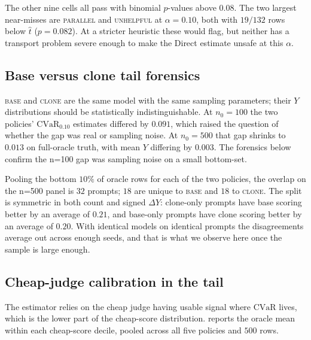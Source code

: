 \documentclass[11pt]{article}
\newcommand{\that}{\widehat{t}}
\newcommand{\CVaR}{\mathrm{CVaR}}
\begin{document}
The other nine cells all pass with binomial $p$-values above $0.08$.
The two largest near-misses are \textsc{parallel} and \textsc{unhelpful}
at $\alpha = 0.10$, both with $19/132$ rows below $\that$ ($p = 0.082$).
At a stricter heuristic these would flag, but neither has a transport
problem severe enough to make the Direct estimate unsafe at this
$\alpha$.

\subsection{Base versus clone tail forensics}
\label{app:bcforensics}

\textsc{base} and \textsc{clone} are the same model with the same
sampling parameters; their $Y$ distributions should be statistically
indistinguishable. At $n_0 = 100$ the two policies' $\CVaR_{0.10}$
estimates differed by $0.091$, which raised the question of whether
the gap was real or sampling noise. At $n_0 = 500$ that gap shrinks
to $0.013$ on full-oracle truth, with mean $Y$ differing by $0.003$.
The forensics below confirm the n=100 gap was sampling noise on a
small bottom-set.

Pooling the bottom $10\%$ of oracle rows for each of the two policies,
the overlap on the n=500 panel is $32$ prompts; $18$ are unique to
\textsc{base} and $18$ to \textsc{clone}. The split is symmetric in
both count and signed $\Delta Y$: clone-only prompts have base scoring
better by an average of $0.21$, and base-only prompts have clone
scoring better by an average of $0.20$. With identical models on
identical prompts the disagreements average out across enough seeds,
and that is what we observe here once the sample is large enough.

\subsection{Cheap-judge calibration in the tail}
\label{app:reliability}

The estimator relies on the cheap judge having usable signal where
$\CVaR$ lives, which is the lower part of the cheap-score
distribution.  reports the oracle mean within
each cheap-score decile, pooled across all five policies and $500$
rows.
\end{document}
